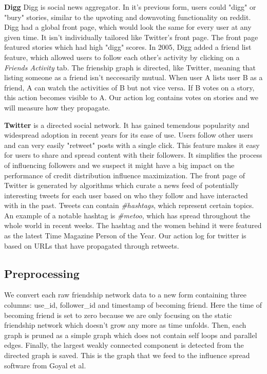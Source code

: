 \documentclass{acm_proc_article-sp}
\begin{document}
\textbf{Digg} \cite{data:digg-friends,data:digg-votes,data:digg} Digg is social news aggregator. In it's previous form, users could "digg" or "bury" stories, similar to the upvoting and downvoting functionality on reddit. Digg had a global front page, which would look the same for every user at any given time. It isn't individually tailored like Twitter's front page. The front page featured stories which had high "digg" scores. In 2005, Digg added a friend list feature, which allowed users to follow each other's activity by clicking on a \textit{Friends Activity} tab. The frienship graph is directed, like Twitter, meaning that listing someone as a friend isn't neccesarily mutual. When user A lists user B as a friend, A can watch the activities of B but not vice versa. If B votes on a story, this action becomes visible to A. Our action log contains votes on stories and we will measure how they propagate. \cite{DBLP:journals/corr/abs-1202-3162}

\textbf{Twitter} \cite{data:twitter} is a directed social network. It has gained temendous popularity and widespread adoption in recent years for its ease of use. Users follow other users and can very easily "retweet" posts with a single click. This feature makes it easy for users to share and spread content with their followers. It simplifies the process of influencing followers and we suspect it might have a big impact on the performance of credit distribution influence maximization. The front page of Twitter is generated by algorithms which curate a news feed of potentially interesting tweets for each user based on who they follow and have interacted with in the past. Tweets can contain \textit{\#hashtags}, which represent certain topics. An example of a notable hashtag is \textit{\#metoo}, which has spread throughout the whole world in recent weeks. The hashtag and the women behind it were featured as the latest Time Magazine Person of the Year. Our action log for twitter is based on URLs that have propagated through retweets.

\subsection{Preprocessing}
We convert each raw friendship network data to a new form containing three columns: use\_id, follower\_id and timestamp of becoming friend. Here the time of becoming friend is set to zero because we are only focusing on the static friendship network which doesn't grow any more as time unfolds. Then, each graph is pruned as a simple graph which does not contain self loops and parallel edges. Finally, the largest weakly connected component is detected from the directed graph is saved. This is the graph that we feed to the influence spread software from Goyal et al.
\end{document}
